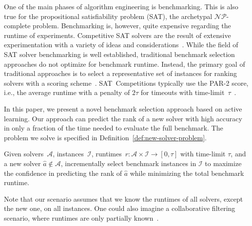 \documentclass[runningheads]{llncs}
\begin{document}
One of the main phases of algorithm engineering is benchmarking.
This is also true for the propositional satisfiability problem (SAT), the archetypal $\mathcal{NP}$-complete problem.
Benchmarking is, however, quite expensive regarding the runtime of experiments.
Competitive SAT solvers are the result of extensive experimentation with a variety of ideas and considerations~\cite{FroleyksHIJS21,sat2022}.
While the field of SAT solver benchmarking is well established, traditional benchmark selection approaches do not optimize for benchmark runtime.
Instead, the primary goal of traditional approaches is to select a representative set of instances for ranking solvers with a scoring scheme~\cite{Gelder11,HoosKSS13}.
SAT~Competitions typically use the \mbox{PAR-2} score, i.e., the average runtime with a penalty of $2 \tau$ for timeouts with time-limit~$\tau$~\cite{FroleyksHIJS21}.

In this paper, we present a novel benchmark selection approach based on active learning.
Our approach can predict the rank of a new solver with high accuracy in only a fraction of the time needed to evaluate the full benchmark.
The problem we solve is specified in Definition~\ref{def:new-solver-problem}.

\begin{definition}
  Given solvers~$\mathcal{A}$, instances~$\mathcal{I}$, runtimes~$r\!: \mathcal{A} \times \mathcal{I} \rightarrow \left[0, \tau\right]$ with time-limit $\tau$, and a new solver $\hat{a} \notin \mathcal{A}$, incrementally select benchmark instances in $\mathcal{I}$ to maximize the confidence in predicting the rank of $\hat{a}$ while minimizing the total benchmark runtime.
  \label{def:new-solver-problem}
\end{definition}

Note that our scenario assumes that we know the runtimes of all solvers, except the new one, on all instances.
One could also imagine a collaborative filtering scenario, where runtimes are only partially known~\cite{misir2017data,misir2017alors}.
\end{document}
